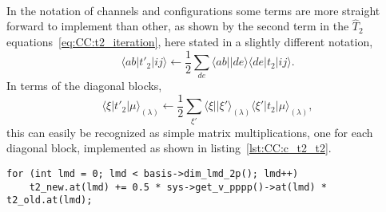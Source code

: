 \paragraph*{}
In the notation of channels and configurations some terms are more straight forward to implement than other, as shown by the second term in the $\hat{T}_2$ equations~\eqref{eq:CC:t2_iteration}, here stated in a slightly different notation,
\begin{equation}
\langle ab |t'_2 | ij \rangle \leftarrow \frac{1}{2} \sum_{de} \langle ab || de \rangle \langle de |t_2| ij \rangle .
\end{equation}
In terms of the diagonal blocks,
\begin{equation}
\label{eq:CC:t2_t2_diag}
\langle \xi | t'_2 | \mu \rangle_{(\lambda)} \leftarrow \frac{1}{2} \sum_{\xi'} \langle \xi || \xi' \rangle_{(\lambda)} \langle \xi' |t_2| \mu \rangle_{(\lambda)},
\end{equation}
this can easily be recognized as simple matrix multiplications, one for each diagonal block, implemented as shown in listing~\ref{lst:CC:c_t2_t2}.
\begin{lstlisting}[float,label=lst:CC:c_t2_t2,caption={Implementation of the second term in the $\hat{T}_2$ equations.}]
for (int lmd = 0; lmd < basis->dim_lmd_2p(); lmd++)
	t2_new.at(lmd) += 0.5 * sys->get_v_pppp()->at(lmd) * t2_old.at(lmd);
\end{lstlisting}


